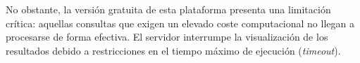 No obstante, la versión gratuita de esta plataforma presenta una limitación crítica: aquellas consultas que exigen un elevado coste 
computacional no llegan a procesarse de forma efectiva. El servidor interrumpe la visualización de los resultados debido a restricciones 
en el tiempo máximo de ejecución (\textit{timeout}).



